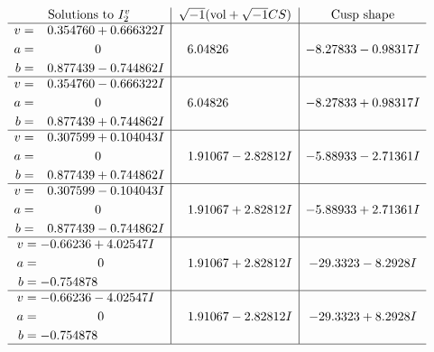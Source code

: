\documentclass[1p]{elsarticle_modified}
\theoremstyle{definition}
\newcommand{\I}{\sqrt{-1}}
\begin{document}
$$\begin{array}{c|c|c}  
\text{Solutions to }I^v_{2}& \I (\text{vol} + \sqrt{-1}CS) & \text{Cusp shape}\\
 \hline 
\begin{aligned}
v &= \phantom{-}0.354760 + 0.666322 I \\
a &= \phantom{-0.000000 } 0 \\
b &= \phantom{-}0.877439 - 0.744862 I\end{aligned}
 & \phantom{-}6.04826\phantom{ +0.000000I} & -8.27833 - 0.98317 I \\ \hline\begin{aligned}
v &= \phantom{-}0.354760 - 0.666322 I \\
a &= \phantom{-0.000000 } 0 \\
b &= \phantom{-}0.877439 + 0.744862 I\end{aligned}
 & \phantom{-}6.04826\phantom{ +0.000000I} & -8.27833 + 0.98317 I \\ \hline\begin{aligned}
v &= \phantom{-}0.307599 + 0.104043 I \\
a &= \phantom{-0.000000 } 0 \\
b &= \phantom{-}0.877439 + 0.744862 I\end{aligned}
 & \phantom{-}1.91067 - 2.82812 I & -5.88933 - 2.71361 I \\ \hline\begin{aligned}
v &= \phantom{-}0.307599 - 0.104043 I \\
a &= \phantom{-0.000000 } 0 \\
b &= \phantom{-}0.877439 - 0.744862 I\end{aligned}
 & \phantom{-}1.91067 + 2.82812 I & -5.88933 + 2.71361 I \\ \hline\begin{aligned}
v &= -0.66236 + 4.02547 I \\
a &= \phantom{-0.000000 } 0 \\
b &= -0.754878\phantom{ +0.000000I}\end{aligned}
 & \phantom{-}1.91067 + 2.82812 I & -29.3323 - 8.2928 I \\ \hline\begin{aligned}
v &= -0.66236 - 4.02547 I \\
a &= \phantom{-0.000000 } 0 \\
b &= -0.754878\phantom{ +0.000000I}\end{aligned}
 & \phantom{-}1.91067 - 2.82812 I & -29.3323 + 8.2928 I\\
 \hline 
 \end{array}$$\newpage
\end{document}
